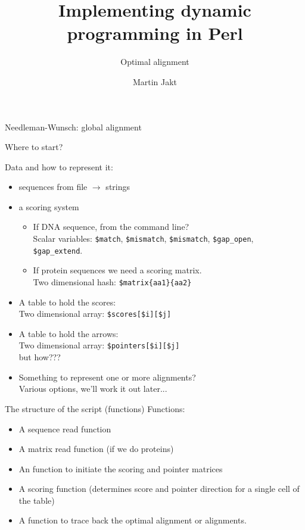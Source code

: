 \documentclass[pdf]{beamer}
\title{Implementing dynamic programming in Perl}
\subtitle{Optimal alignment}
\author{Martin Jakt}
\begin{document}
\begin{frame}
  \titlepage
\end{frame}


\begin{frame}{Needleman-Wunsch: global alignment}
  \begin{figure}[ht]
    \begin{tikzpicture}[scale=0.5]
      
    \end{tikzpicture}
  \end{figure}
\end{frame}

\begin{frame}[fragile]{Where to start?}
  \footnotesize{
  Data and how to represent it:
  \begin{itemize}
  \item sequences from file $\rightarrow$ strings
  \item a scoring system
    \footnotesize{
    \begin{itemize}
      \item If DNA sequence, from the command line?\\
        Scalar variables: \verb|$match|, \verb|$mismatch|, \verb|$mismatch|,
        \verb|$gap_open|, \verb|$gap_extend|.
      \item If protein sequences we need a scoring matrix.\\
        Two dimensional hash: \verb|$matrix{aa1}{aa2}|
    \end{itemize}
    }
  \item A table to hold the scores:\\
    Two dimensional array: \verb|$scores[$i][$j]|
  \item A table to hold the arrows:\\
    Two dimensional array: \verb|$pointers[$i][$j]|\\
    but how???
  \item Something to represent one or more alignments?\\
    Various options, we'll work it out later...
  \end{itemize}
}
\end{frame}

\begin{frame}[fragile]{The structure of the script (functions)}
  Functions:
  \begin{itemize}
  \item A sequence read function
  \item A matrix read function (if we do proteins)
  \item An function to initiate the scoring and pointer matrices
  \item A scoring function (determines score and pointer direction for a
    single cell of the table)
  \item A function to trace back the optimal alignment or alignments.
  \end{itemize}
\end{frame}
\end{document}

